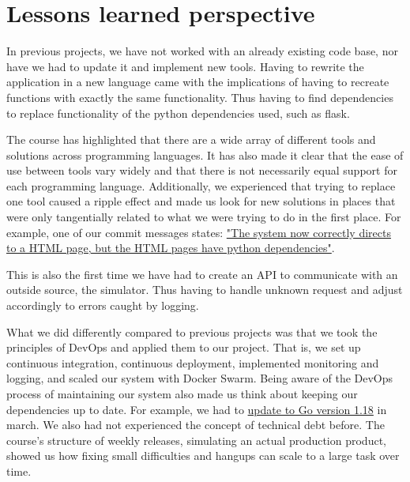 \section{Lessons learned perspective}

In previous projects, we have not worked with an already existing code base, nor have we had to update it and implement new tools. Having to rewrite the application in a new language came with the implications of having to recreate functions with exactly the same functionality. Thus having to find dependencies to replace functionality of the python dependencies used, such as flask.

The course has highlighted that there are a wide array of different tools and solutions across programming languages. It has also made it clear that the ease of use between tools vary widely and that there is not necessarily equal support for each programming language. Additionally, we experienced that trying to replace one tool caused a ripple effect and made us look for new solutions in places that were only tangentially related to what we were trying to do in the first place. For example, one of our commit messages states: \href{https://github.com/salsitu/minitwit_thesvindler/commit/b0a6703feba3e1e3453358d563e0cce79fe8b6e3}{"The system now correctly directs to a HTML page, but the HTML pages have python dependencies"}.

This is also the first time we have had to create an API to communicate with an outside source, the simulator. Thus having to handle unknown request and adjust accordingly to errors caught by logging.

What we did differently compared to previous projects was that we took the principles of DevOps and applied them to our project. That is, we set up continuous integration, continuous deployment, implemented monitoring and logging, and scaled our system with Docker Swarm. Being aware of the DevOps process of maintaining our system also made us think about keeping our dependencies up to date. For example, we had to \href{https://github.com/salsitu/minitwit_thesvindler/commit/7785e42ec56e38445815946b7efa980dc9502044}{ update to Go version 1.18} in march.
We also had not experienced the concept of technical debt before. The course's structure of weekly releases, simulating an actual production product, showed us how fixing small difficulties and hangups can scale to a large task over time.

